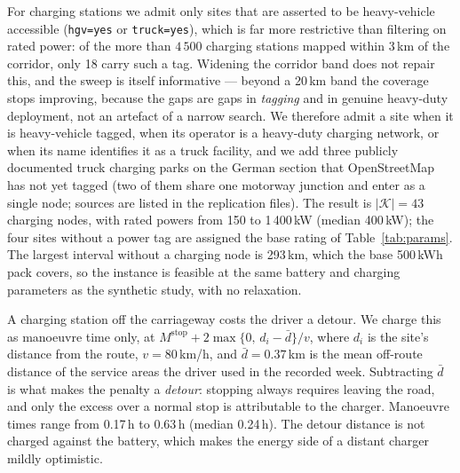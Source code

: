 For charging stations we admit only sites that are asserted to be
heavy-vehicle accessible (\texttt{hgv=yes} or \texttt{truck=yes}), which is far
more restrictive than filtering on rated power: of the more than $4\,500$
charging stations mapped within 3\,km of the corridor, only 18 carry such a
tag.  Widening the corridor band does not repair this, and the sweep is itself
informative --- beyond a 20\,km band the coverage stops improving, because the
gaps are gaps in \emph{tagging} and in genuine heavy-duty deployment, not an
artefact of a narrow search.  We therefore admit a site when it is
heavy-vehicle tagged, when its operator is a heavy-duty charging network, or
when its name identifies it as a truck facility, and we add three publicly
documented truck charging parks on the German section that OpenStreetMap has
not yet tagged (two of them share one motorway junction and enter as a single
node; sources are listed in the replication files).
The result is $|\mathcal K| = 43$ charging nodes, with rated powers from 150 to
1\,400\,kW (median 400\,kW); the four sites without a power tag are assigned
the base rating of Table~\ref{tab:params}.  The largest interval without a
charging node is 293\,km, which the base 500\,kWh pack covers, so the instance
is feasible at the same battery and charging parameters as the synthetic
study, with no relaxation.

A charging station off the carriageway costs the driver a detour.  We charge
this as manoeuvre time only, at
$M^{\text{stop}} + 2\max\{0,\, d_i - \bar d\}/v$, where $d_i$ is the site's
distance from the route, $v = 80$\,km/h, and $\bar d = 0.37$\,km is the mean
off-route distance of the service areas the driver used in the recorded week.
Subtracting $\bar d$ is what makes the penalty a \emph{detour}: stopping
always requires leaving the road, and only the excess over a normal stop is
attributable to the charger.  Manoeuvre times range from 0.17\,h to 0.63\,h
(median 0.24\,h).  The detour distance is not charged against the battery, which
makes the energy side of a distant charger mildly optimistic.

